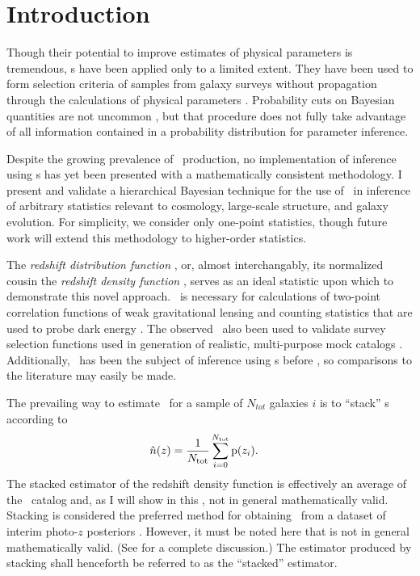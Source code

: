\section{Introduction}

Though their potential to improve estimates of physical parameters is tremendous, \pzpdf s have been applied only to a limited extent.  
They have been used to form selection criteria of samples from galaxy surveys without propagation 
through the calculations of physical parameters \citep{VanBreukelen2009,Viironen2015}.  
Probability cuts on Bayesian quantities are not uncommon \citep{Leung2015, DiPompeo2015a}, but that procedure does not fully take advantage of all information contained in a probability distribution for parameter inference.  

Despite the growing prevalence of \pzpdf\ production, no implementation of inference using \pzpdf s has yet been presented with a mathematically consistent methodology.  
I present and validate a hierarchical Bayesian technique for the use of \pzpdf\ in inference of arbitrary statistics relevant to cosmology, large-scale structure, and galaxy evolution.  
For simplicity, we consider only one-point statistics, though future work will extend this methodology to higher-order statistics.

The \textit{redshift distribution function \Nz}, or, almost interchangably, its normalized cousin the \textit{redshift density function \nz}, serves as an ideal statistic upon which to demonstrate this novel approach.  
\Nz\ is necessary for calculations of two-point correlation functions of weak gravitational lensing and counting statistics that are used to probe dark energy \citep{Masters2015}.  
The observed \Nz\ also been used to validate survey selection functions used in generation of realistic, multi-purpose mock catalogs \citep{Norberg2002}.  
Additionally, \Nz\ has been the subject of inference using \pzpdf s before \citep{Sheldon2012, Hildebrandt2012, Kelly2014, Benjamin2013, Bonnett2015a, Viironen2015, Asorey2016, Leistedt2016}, so comparisons to the literature may easily be made. 

The prevailing way to estimate \nz\ for a sample of $N_{tot}$ galaxies $i$ is to ``stack'' \pzpdf s according to
\begin{align}
\eqlabel{eqn:stack}
\hat{n}(z) &= \frac{1}{\ntot} \sum_{i = 0}^{\ntot} \pr{z_{i}} .
\end{align}
The stacked estimator of the redshift density function is effectively an average of the \pzpdf\ catalog and, as I will show in this \paper, not in general mathematically valid.
Stacking is considered the preferred method for obtaining \Nz\ from a dataset of interim photo-$z$ posteriors \citep{Sheldon2012, Kelly2014, Benjamin2013, Bonnett2015a, Viironen2015, Asorey2016}.  
However, it must be noted here that  is not in general mathematically valid.  
(See \citet{Hogg2012} for a complete discussion.)  
The estimator produced by stacking shall henceforth be referred to as the ``stacked'' estimator.


